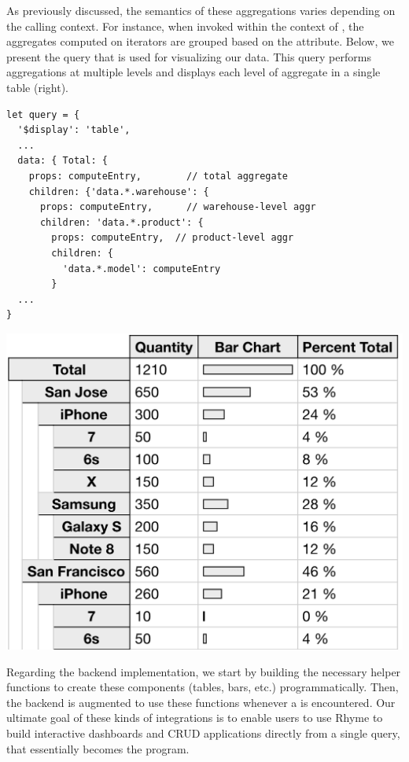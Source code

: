 \documentclass[runningheads]{llncs}
\newcommand{\lang}{Rhyme}
\begin{document}
As previously discussed, the semantics of these aggregations varies depending on the
calling context.
For instance, when invoked within the context of , the
aggregates computed on \inline{*} iterators are grouped based on the  attribute.
Below, we present the query that is used for visualizing our data.
This query performs aggregations at multiple levels and displays each level of
aggregate in a single table (right).

\hspace{-18pt}
\begin{minipage}{0.6\textwidth}
\begin{lstlisting}[style=JavaScript,columns=flexible]
let query = {
  '$display': 'table',
  ...
  data: { Total: {                    
    props: computeEntry,        // total aggregate           
    children: {'data.*.warehouse': { 
      props: computeEntry,      // warehouse-level aggr
      children: 'data.*.product': {     
        props: computeEntry,  // product-level aggr
        children: {
          'data.*.model': computeEntry
        }
  ...
}
\end{lstlisting}
\end{minipage}%
\begin{minipage}{0.4\textwidth}
\centering
\includegraphics[width=\textwidth]{images/big_table.png}
\end{minipage}

Regarding the backend implementation, we start by building the necessary helper
functions to create these components (tables, bars, etc.) programmatically.
Then, the backend is augmented to use these functions whenever a 
is encountered.
Our ultimate goal of these kinds of integrations is to enable users
to use \lang{} to build interactive dashboards and CRUD applications 
directly from a single query, that essentially becomes the program.
\end{document}
